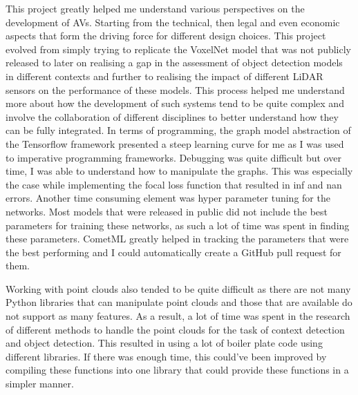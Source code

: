 This project greatly helped me understand various perspectives on the development of AVs. Starting from the technical, then legal and even economic aspects that form the driving force for different design choices. 
This project evolved from simply trying to replicate the VoxelNet model that was not publicly released to later on realising a gap in the assessment of object detection models in different contexts and further to realising the impact of different LiDAR sensors on the performance of these models. This process helped me understand more about how the development of such systems tend to be quite complex and involve the collaboration of different disciplines to better understand how they can be fully integrated.
In terms of programming, the graph model abstraction of the Tensorflow framework presented a steep learning curve for me as I was used to imperative programming frameworks. Debugging was quite difficult but over time, I was able to understand how to manipulate the graphs. This was especially the case while implementing the focal loss function that resulted in inf and nan errors. Another time consuming element was hyper parameter tuning for the networks. Most models that were released in public did not include the best parameters for training these networks, as such a lot of time was spent in finding these parameters. 
CometML greatly helped in tracking the parameters that were the best performing and I could automatically create a GitHub pull request for them. 	

 Working with point clouds also tended to be quite difficult as there are not many Python libraries that can manipulate point clouds and those that are available do not support as many features. As a result, a lot of time was spent in the research of different methods to handle the point clouds for the task of context detection and object detection. This resulted in using a lot of boiler plate code using different libraries. If there was enough time, this could've been improved by compiling these functions into one library that could provide these functions in a simpler manner. 
 